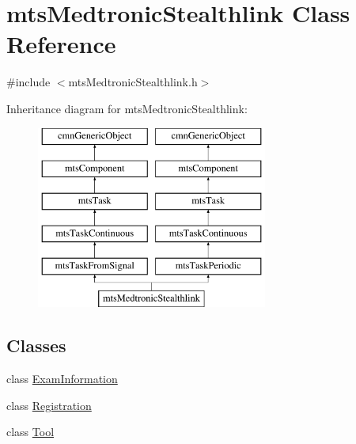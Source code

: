\hypertarget{classmts_medtronic_stealthlink}{\section{mts\-Medtronic\-Stealthlink Class Reference}
\label{classmts_medtronic_stealthlink}
}


{\ttfamily \#include $<$mts\-Medtronic\-Stealthlink.\-h$>$}

Inheritance diagram for mts\-Medtronic\-Stealthlink\-:\begin{figure}[H]
\begin{center}
\leavevmode
\includegraphics[height=6.000000cm]{dc/d49/classmts_medtronic_stealthlink}
\end{center}
\end{figure}
\subsection*{Classes}
\begin{DoxyCompactItemize}
\item 
class \hyperlink{classmts_medtronic_stealthlink_1_1_exam_information}{Exam\-Information}
\item 
class \hyperlink{classmts_medtronic_stealthlink_1_1_registration}{Registration}
\item 
class \hyperlink{classmts_medtronic_stealthlink_1_1_tool}{Tool}
\end{DoxyCompactItemize}
